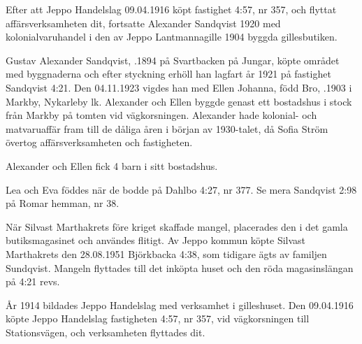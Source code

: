 Efter att Jeppo Handelslag 09.04.1916 köpt fastighet 4:57, nr	357, och flyttat affärsverksamheten dit, fortsatte Alexander Sandqvist	1920 med kolonialvaruhandel i den av Jeppo Lantmannagille 1904 byggda gillesbutiken.


Gustav Alexander Sandqvist, .1894 på Svartbacken på Jungar, köpte området med byggnaderna och efter styckning	erhöll han lagfart år 1921 på fastighet Sandqvist 4:21. Den 04.11.1923 vigdes han med Ellen Johanna, född Bro, .1903 i Markby, Nykarleby lk. Alexander och Ellen byggde genast ett bostadshus i stock från Markby på tomten vid vägkorsningen. Alexander hade kolonial- och matvaruaffär fram till de dåliga åren i början av 1930-talet, då Sofia Ström övertog affärsverksamheten och fastigheten.

Alexander och Ellen fick 4 barn i sitt bostadshus.
\begin{jhchildren}
  \item {}
  \item {}
  \item {}
  \item {}
\end{jhchildren}
Lea och Eva föddes när de bodde på Dahlbo 4:27, nr 377. Se mera Sandqvist 2:98 på Romar hemman, nr 38.

När Silvast Marthakrets före kriget skaffade mangel, placerades den i det gamla butiksmagasinet och användes flitigt. Av Jeppo kommun köpte Silvast Marthakrets den 28.08.1951 Björkbacka 4:38, som tidigare ägts av familjen Sundqvist. Mangeln flyttades till det inköpta huset och den röda magasinslängan på 4:21 revs.


År 1914 bildades Jeppo Handelslag med verksamhet i gilleshuset. Den 09.04.1916 köpte Jeppo Handelslag fastigheten 4:57, nr 357, vid vägkorsningen till Stationsvägen, och verksamheten flyttades dit.


